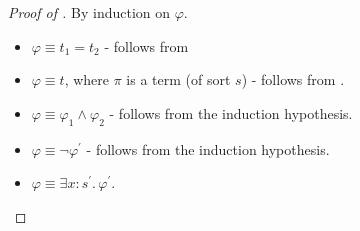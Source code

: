 \begin{proof}[Proof of ]
By induction on $\varphi$.
\begin{itemize}
    \item $\varphi \equiv t_1 = t_2$ - follows from 
    \item $\varphi \equiv t$, where $\pi$ is a term (of sort $s$) - follows from .
    \item $\varphi \equiv \varphi_1 \land \varphi_2$ - follows from the induction hypothesis.
    \item $\varphi \equiv \neg \varphi^\prime$ - follows from the induction hypothesis.
    \item $\varphi \equiv \exists x : s^\prime.\, \varphi^\prime$.


\end{itemize}
\end{proof}
